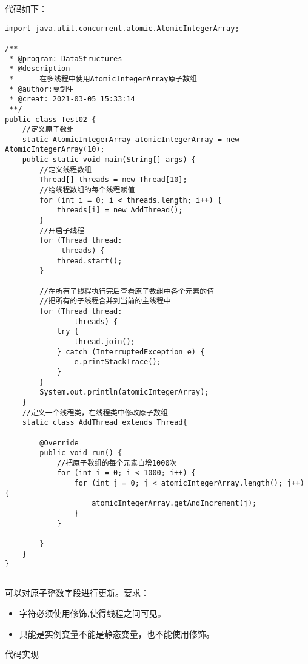\documentclass[a4paper]{report}
\begin{document}
代码如下：
\begin{Verbatim}[frame=single,numbersep=5pt,xleftmargin=1.5em,xrightmargin=1.5em]
import java.util.concurrent.atomic.AtomicIntegerArray;

/**
 * @program: DataStructures
 * @description
 *      在多线程中使用AtomicIntegerArray原子数组
 * @author:戛剑生
 * @creat: 2021-03-05 15:33:14
 **/
public class Test02 {
    //定义原子数组
    static AtomicIntegerArray atomicIntegerArray = new AtomicIntegerArray(10);
    public static void main(String[] args) {
        //定义线程数组
        Thread[] threads = new Thread[10];
        //给线程数组的每个线程赋值
        for (int i = 0; i < threads.length; i++) {
            threads[i] = new AddThread();
        }
        //开启子线程
        for (Thread thread:
             threads) {
            thread.start();
        }

        //在所有子线程执行完后查看原子数组中各个元素的值
        //把所有的子线程合并到当前的主线程中
        for (Thread thread:
                threads) {
            try {
                thread.join();
            } catch (InterruptedException e) {
                e.printStackTrace();
            }
        }
        System.out.println(atomicIntegerArray);
    }
    //定义一个线程类，在线程类中修改原子数组
    static class AddThread extends Thread{

        @Override
        public void run() {
            //把原子数组的每个元素自增1000次
            for (int i = 0; i < 1000; i++) {
                for (int j = 0; j < atomicIntegerArray.length(); j++) {
                    atomicIntegerArray.getAndIncrement(j);
                }
            }

        }
    }
}
\end{Verbatim}
\subsection{}
可以对原子整数字段进行更新。要求：
\begin{itemize}
  \item 字符必须使用修饰,使得线程之间可见。
  \item 只能是实例变量不能是静态变量，也不能使用修饰。
\end{itemize}

代码实现
\end{document}
